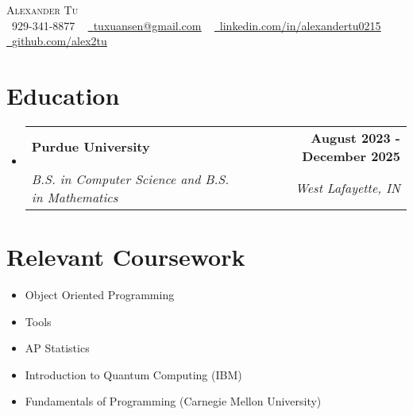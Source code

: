 \documentclass[letterpaper,11pt]{article}
\makeatletter
\newcommand{\resumeSubheading}[4]{
  \vspace{-2pt}\item
    \begin{tabular*}{1.0\textwidth}[t]{l@{\extracolsep{\fill}}r}
      \textbf{#1} & \textbf{\small #2} \\
      \textit{\small#3} & \textit{\small #4} \\
    \end{tabular*}\vspace{-7pt}
}
\newcommand{\resumeSubHeadingListStart}{\begin{itemize}[leftmargin=0.0in, label={}]}
\newcommand{\resumeSubHeadingListEnd}{\end{itemize}}
\makeatother
\begin{document}

\begin{center}
    {\Huge \scshape Alexander Tu} \\ \vspace{1pt}
    \small \raisebox{-0.1\height}\faPhone\ 929-341-8877 ~ \href{mailto:tuxuansen@gmail.com}{\raisebox{-0.2\height}\faEnvelope\  \underline{tuxuansen@gmail.com}} ~ 
    \href{https://linkedin.com/in/alexandertu0215/}{\raisebox{-0.2\height}\faLinkedin\ \underline{linkedin.com/in/alexandertu0215}}  ~
    \href{https://github.com/alex2tu}{\raisebox{-0.2\height}\faGithub\ \underline{github.com/alex2tu}}
    \vspace{-8pt}
\end{center}


\section{Education}
  \resumeSubHeadingListStart
    \resumeSubheading
      {Purdue University}{August 2023 - December 2025}
      {B.S. in Computer Science and B.S. in Mathematics}{West Lafayette, IN}
  \resumeSubHeadingListEnd

\section{Relevant Coursework}
        \begin{multicols}{2}
            \begin{itemize}[itemsep=-4pt, parsep=3pt]
                \item\small Object Oriented Programming
                \item Tools
                \item AP Statistics
                \item Introduction to Quantum Computing (IBM)
                \item Fundamentals of Programming (Carnegie Mellon University)
            \end{itemize}
        \end{multicols}
        \vspace*{2.0\multicolsep}
\end{document}
